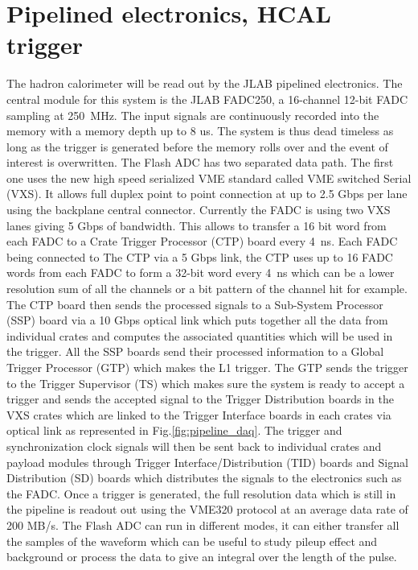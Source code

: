 \documentclass{article}
\begin{document}
\section{Pipelined electronics, HCAL trigger}
\label{sec:hcal-vxs}
The hadron calorimeter will be read out by the JLAB pipelined electronics.
The central module for this system is the JLAB FADC250, a 16-channel 12-bit FADC sampling at 250~MHz. The input signals are continuously recorded into the memory with a memory depth up to 8 us. The system is thus dead timeless as long as the trigger is generated before the memory rolls over and the event of interest is overwritten.
The Flash ADC has two separated data path.
The first one uses the new high speed serialized VME standard called VME switched Serial (VXS).
It allows full duplex point to point connection at up to 2.5 Gbps per lane using the backplane central connector.
Currently the FADC is using two VXS lanes giving 5 Gbps of bandwidth.
This allows to transfer a 16 bit word from each FADC to a Crate Trigger Processor (CTP) board every 4~ns.
Each FADC being connected to The CTP via a 5 Gbps link, the CTP uses up to 16 FADC words from each FADC to form a 32-bit word every 4~ns which can be a lower resolution sum of all the channels or a bit pattern of the channel hit for example.
The CTP board then sends the processed signals to a Sub-System Processor (SSP) board via a 10 Gbps optical link which puts together all the data from individual crates and computes the associated quantities which will be used in the trigger.
All the SSP boards send their processed information to a Global Trigger Processor (GTP) which makes the L1 trigger.
The GTP sends the trigger to the Trigger Supervisor (TS) which makes sure the system is ready to accept a trigger and sends the accepted signal to the Trigger Distribution boards in the VXS crates which are linked to the Trigger Interface boards in each crates via optical link as represented in Fig.\ref{fig:pipeline_daq}.
The trigger and synchronization clock signals will then be sent back to individual crates and payload modules through Trigger Interface/Distribution (TID) boards and Signal Distribution (SD) boards which distributes the signals to the electronics such as the FADC.
Once a trigger is generated, the full resolution data which is still in the pipeline is readout out using the VME320 protocol at an average data rate of 200 MB/s.
The Flash ADC can run in different modes, it can either transfer all the samples of the waveform which can be useful to study pileup effect and background or process the data to give an integral over the length of the pulse.
\end{document}
